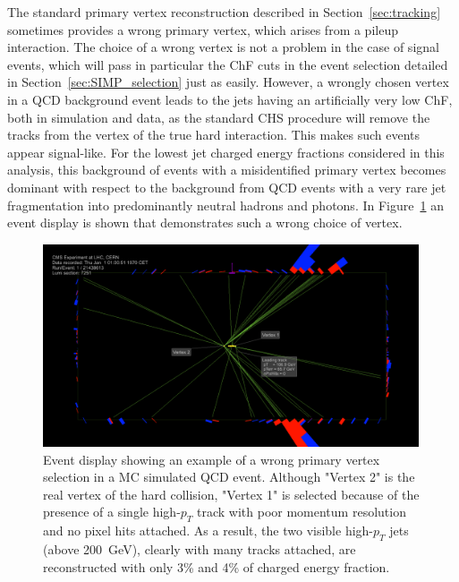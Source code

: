 The standard primary  vertex reconstruction described in Section~\ref{sec:tracking} sometimes provides a wrong primary vertex, which arises from a pileup interaction. The choice of a wrong vertex is not a problem in the case of signal events, which will pass in particular the ChF cuts in the event selection detailed in Section~\ref{sec:SIMP_selection} just as easily. However, a wrongly chosen vertex in a \ac{QCD} background event leads to the jets having an artificially very low ChF, both in simulation and data, as the standard \acf{CHS} procedure will remove the tracks from the vertex of the true hard interaction. This makes such events appear signal-like. For the lowest jet charged energy fractions considered in this analysis, this background of events with a misidentified primary vertex becomes dominant with respect to the background from \ac{QCD} events with a very rare jet fragmentation into predominantly neutral hadrons and photons. In Figure~\ref{fig:wrongvertex} an event display is shown that demonstrates such a wrong choice of vertex.

\begin{figure}[ht]
  \centering
  \includegraphics[width=0.99\textwidth]{figures/wrongvertex.png}
  \caption{Event display showing an example of a wrong primary vertex selection in a MC simulated \ac{QCD} event. Although "Vertex 2" is the real vertex of the hard collision, "Vertex 1" is selected because of the presence of a single high-$p_T$ track with poor momentum resolution and no pixel hits attached. As a result, the two visible high-$p_T$ jets (above \SI{200}{GeV}), clearly with many tracks attached, are reconstructed with only 3\% and 4\% of charged energy fraction.}
  \label{fig:wrongvertex}
\end{figure} 

